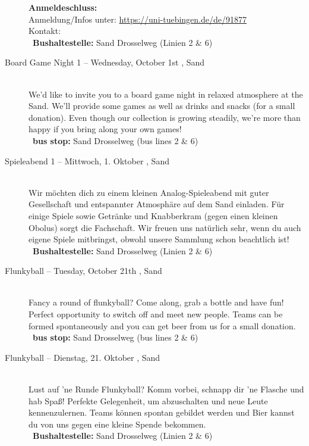 \begin{description}
    \textbf{Anmeldeschluss:} \matheanmeldung\YEAR\\
    Anmeldung/Infos unter: \url{https://uni-tuebingen.de/de/91877}\\
    Kontakt: \texttt{\mathkontakt}
    \ifsommersemester
        \\ ~\textbf{Bushaltestelle:} Sand Drosselweg (Linien 2 \& 6)
    \fi
\fi


\ifml
    \item[Board Game Night 1 -- Wednesday, October 1st \YEAR, Sand]~\\%
    We'd like to invite you to a board game night in relaxed atmosphere at the Sand.
    We'll provide some games as well as drinks and snacks (for a small donation).
    Even though our collection is growing steadily, we're more than happy if you bring along your own games!\\
    ~\textbf{bus stop:} Sand Drosselweg (bus lines 2 \& 6)
\else
    \item[Spieleabend 1 -- Mittwoch, 1. Oktober \YEAR, Sand]~\\%
    Wir möchten dich zu einem kleinen Analog-Spieleabend mit guter Gesellschaft und entspannter Atmosphäre auf dem Sand einladen.
    Für einige Spiele sowie Getränke und Knabberkram (gegen einen kleinen Obolus) sorgt die Fachschaft.
    Wir freuen uns natürlich sehr, wenn du auch eigene Spiele mitbringst, obwohl unsere Sammlung schon beachtlich ist!\\
    ~\textbf{Bushaltestelle:} Sand Drosselweg (Linien 2 \& 6)
\fi

\ifml
    \item[Flunkyball -- Tuesday, October 21th \YEAR, Sand]~\\
    Fancy a round of flunkyball? Come along, grab a bottle and have fun!
    Perfect opportunity to switch off and meet new people.
    Teams can be formed spontaneously and you can get beer from us for a small donation.\\
    ~\textbf{bus stop:} Sand Drosselweg (bus lines 2 \& 6)
\else
    \item[Flunkyball -- Dienstag, 21. Oktober \YEAR, Sand]~\\
    Lust auf 'ne Runde Flunkyball? Komm vorbei, schnapp dir 'ne Flasche und hab Spaß!
    Perfekte Gelegenheit, um abzuschalten und neue Leute kennenzulernen.
    Teams können spontan gebildet werden und Bier kannst du von uns gegen eine kleine Spende bekommen.\\
    ~\textbf{Bushaltestelle:} Sand Drosselweg (Linien 2 \& 6)
\fi


\end{description}
